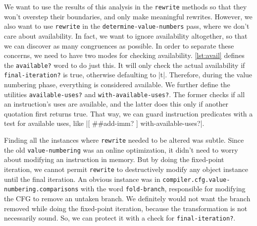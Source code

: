 We want to use the results of this analysis in the \Verb|rewrite| methods so
that they won't overstep their boundaries, and only make meaningful rewrites.
However, we also want to use \Verb|rewrite| in the
\Verb|determine-value-numbers| pass, where we don't care about availability.
In fact, we want to ignore availability altogether, so that we can discover as
many congruences as possible.  In order to separate these concerns, we need to
have two modes for checking availability.  \vref{lst:avail} defines the
\Verb|available?| word to do just this.  It will only check the actual
availability if \Verb|final-iteration?| is true, otherwise defaulting to
\factor|t|.  Therefore, during the value numbering phase, everything is
considered available.  We further define the utilities \Verb|available-uses?|
and \Verb|with-available-uses?|.  The former checks if all an instruction's
uses are available, and the latter does this only if another quotation first
returns true.  That way, we can guard instruction predicates with a test for
available uses, like
%
\factor|[ ##add-imm? ] with-available-uses?|.


Finding all the instances where \Verb|rewrite| needed to be altered was
subtle.  Since the old \Verb|value-numbering| was an online optimization, it
didn't need to worry about modifying an instruction in memory.  But by doing
the fixed-point iteration, we cannot permit \Verb|rewrite| to destructively
modify any object instance until the final iteration.  An obvious instance was
in \Verb|compiler.cfg.value-numbering.comparisons| with the word
\Verb|fold-branch|, responsible for modifying the \gls{CFG} to remove an
untaken branch.  We definitely would not want the branch removed while doing
the fixed-point iteration, because the transformation is not necessarily sound.
So, we can protect it with a check for \Verb|final-iteration?|.


